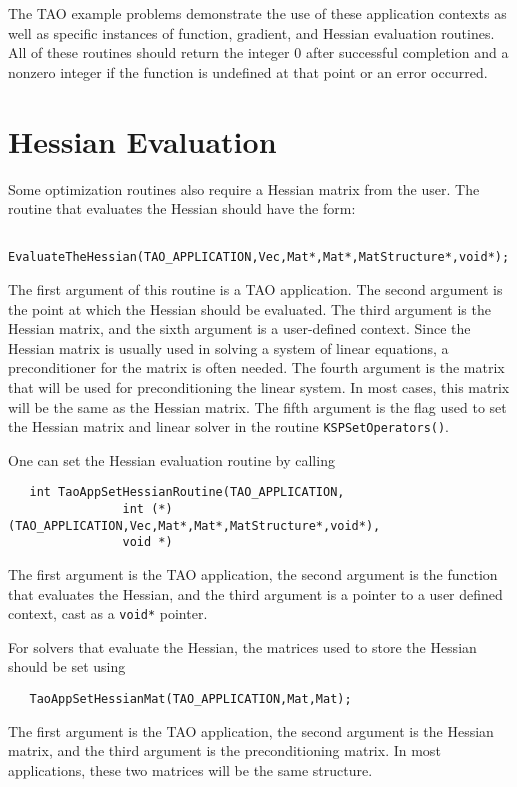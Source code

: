 The TAO example problems demonstrate the use of these application contexts
as well as specific instances of function, gradient, and Hessian 
evaluation routines.
All of these routines should return the integer $0$ after 
successful completion and a nonzero integer if the function
is undefined at that point or an error occurred.

\section{Hessian Evaluation}
\label{sec:matrixfree}
\label{sec:finitedifference}

Some optimization routines also require a Hessian matrix from the user.
The routine that evaluates the Hessian should have the form:
\begin{verbatim}
   EvaluateTheHessian(TAO_APPLICATION,Vec,Mat*,Mat*,MatStructure*,void*);
\end{verbatim}
\noindent
The first argument of this routine is a TAO application.  The second
argument is the point at which the Hessian should be evaluated.  The
third argument is the Hessian matrix, and the sixth argument is a
user-defined context.
Since the Hessian matrix is usually used in solving
a system of linear equations, a preconditioner for the matrix is often
needed.  The fourth argument is the matrix that will be used
for preconditioning the linear system.  In most cases, this
matrix will be the same as the Hessian matrix.  The fifth
argument is the flag used to set the Hessian matrix and
linear solver in the routine {\tt KSPSetOperators()}.

One can set the Hessian evaluation routine by calling 
\begin{verbatim}
   int TaoAppSetHessianRoutine(TAO_APPLICATION,
                int (*)(TAO_APPLICATION,Vec,Mat*,Mat*,MatStructure*,void*),
                void *)
\end{verbatim}
\noindent
The first argument is the TAO application, the second 
argument is the function that evaluates the Hessian, 
and the third argument is a pointer to a user defined context,
cast as a {\tt void*} pointer.

For solvers that evaluate the Hessian, 
the matrices used to store the Hessian should be set using 
\begin{verbatim}
   TaoAppSetHessianMat(TAO_APPLICATION,Mat,Mat);
\end{verbatim}
\noindent
The first argument is the TAO application, the second argument is the Hessian
matrix, and the third argument is the preconditioning matrix.  In most applications,
these two matrices will be the same structure.


